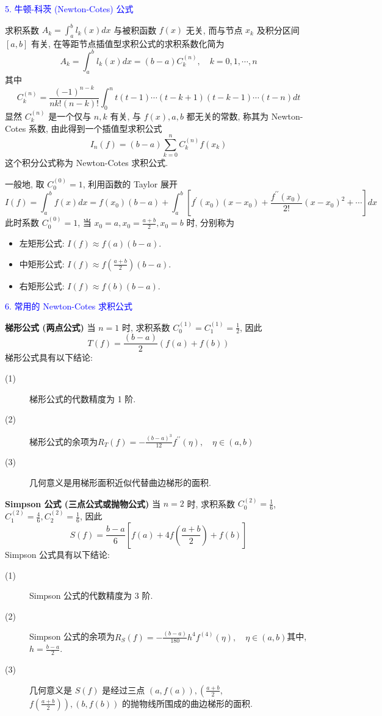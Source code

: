 \textcolor{blue}{5. 牛顿-科茨 (Newton-Cotes) 公式}

求积系数 $ A_{k}=\int_{a}^{b} l_{k}(x) d x $ 与被积函数 $ f(x) $ 无关, 而与节点 $ x_{k} $ 及积分区间 $ [a, b] $ 有关, 在等距节点插值型求积公式的求积系数化简为
$$
A_{k}=\int_{a}^{b} l_{k}(x) d x=(b-a) C_{k}^{(n)}, \quad k=0,1, \cdots, n
$$
其中
$$
C_{k}^{(n)}=\frac{(-1)^{n-k}}{n k!(n-k)!} \int_{0}^{n} t(t-1) \cdots(t-k+1)(t-k-1) \cdots(t-n) d t
$$
显然 $ C_{k}^{(n)} $ 是一个仅与 $ n, k $ 有关, 与 $ f(x), a, b $ 都无关的常数, 称其为 Newton-Cotes 系数, 由此得到一个插值型求积公式
$$
I_{n}(f)=(b-a) \sum_{k=0}^{n} C_{k}^{(n)} f\left(x_{k}\right)
$$
这个积分公式称为 Newton-Cotes 求积公式.

一般地, 取 $ C_{0}^{(0)}=1 $, 利用函数的 Taylor 展开
$$
I(f)=\int_{a}^{b} f(x) d x=f\left(x_{0}\right)(b-a)+\int_{a}^{b}\left[f^{\prime}\left(x_{0}\right)\left(x-x_{0}\right)+\frac{f^{\prime \prime}\left(x_{0}\right)}{2!}\left(x-x_{0}\right)^{2}+\cdots\right] d x
$$
此时系数 $ C_{0}^{(0)}=1 $, 当 $ x_{0}=a, x_{0}=\frac{a+b}{2}, x_{0}=b $ 时, 分别称为
\begin{itemize}
    \item 左矩形公式: $ I(f) \approx f(a)(b-a) $.
    \item 中矩形公式: $ I(f) \approx f\left(\frac{a+b}{2}\right)(b-a) $.
    \item 右矩形公式: $ I(f) \approx f(b)(b-a) $.
\end{itemize}

\textcolor{blue}{6. 常用的 Newton-Cotes 求积公式}

\textbf{梯形公式 (两点公式)} 当 $ n=1 $ 时, 求积系数 $ C_{0}^{(1)}=C_{1}^{(1)}=\frac{1}{2} $, 因此
$$
T(f)=\frac{(b-a)}{2}(f(a)+f(b))
$$
梯形公式具有以下结论:
\begin{description}
    \item[(1)] 梯形公式的代数精度为 1 阶.
    \item[(2)] 梯形公式的余项为$\displaystyle R_{T}(f)=-\frac{(b-a)^{3}}{12} f^{\prime \prime}(\eta), \quad \eta \in(a, b)$
    \item[(3)] 几何意义是用梯形面积近似代替曲边梯形的面积.
\end{description}


\textbf{Simpson 公式 (三点公式或抛物公式)} 当 $ n=2 $ 时, 求积系数 $ C_{0}^{(2)}=\frac{1}{6} $, $ C_{1}^{(2)}=\frac{4}{6}, C_{2}^{(2)}=\frac{1}{6} $, 因此
$$
S(f)=\frac{b-a}{6}\left[f(a)+4 f\left(\frac{a+b}{2}\right)+f(b)\right]
$$
Simpson 公式具有以下结论:
\begin{description}
    \item[(1)] Simpson 公式的代数精度为 3 阶.
    \item[(2)]  Simpson 公式的余项为$\displaystyle R_{S}(f)=-\frac{(b-a)}{180} h^{4} f^{(4)}(\eta), \quad \eta \in(a, b)
$其中, $ h=\frac{b-a}{2} $.
    \item[(3)] 几何意义是 $ S(f) $ 是经过三点 $ (a, f(a)),\left(\frac{a+b}{2}\right. $, $ \left.f\left(\frac{a+b}{2}\right)\right),(b, f(b)) $ 的抛物线所围成的曲边梯形的面积.
\end{description}

